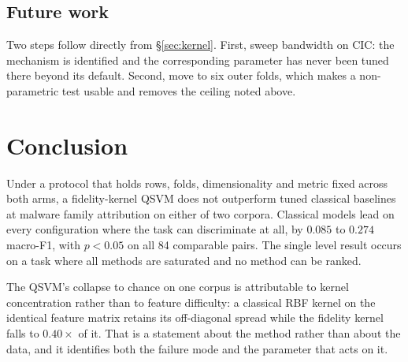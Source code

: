 \documentclass[11pt]{article}
\begin{document}
\subsection{Future work}

Two steps follow directly from §\ref{sec:kernel}. First, sweep bandwidth on CIC:
the mechanism is identified and the corresponding parameter has never been tuned
there beyond its default. Second, move to six outer folds, which makes a
non-parametric test usable and removes the ceiling noted above.

\section{Conclusion}

Under a protocol that holds rows, folds, dimensionality and metric fixed across
both arms, a fidelity-kernel QSVM does not outperform tuned classical baselines at
malware family attribution on either of two corpora. Classical models lead on
every configuration where the task can discriminate at all, by $0.085$ to $0.274$
macro-F1, with $p<0.05$ on all 84 comparable pairs. The single level result occurs
on a task where all methods are saturated and no method can be ranked.

The QSVM's collapse to chance on one corpus is attributable to kernel
concentration rather than to feature difficulty: a classical RBF kernel on the
identical feature matrix retains its off-diagonal spread while the fidelity kernel
falls to $0.40\times$ of it. That is a statement about the method rather than
about the data, and it identifies both the failure mode and the parameter that
acts on it.
\end{document}
